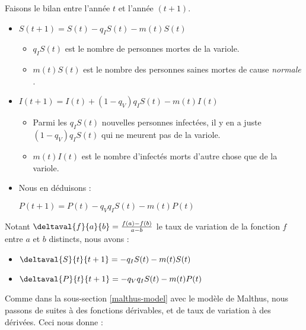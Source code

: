 

\medskip


Faisons le bilan entre l'année $t$ et l'année $(t + 1)$.

\begin{itemize}[label=\small\textbullet]
	\item $S(t + 1) = S(t) - q_I S(t) - m(t) S(t)$
	\begin{itemize}[label=$\rightarrow$]	
		\item $q_I S(t)$ est le nombre de personnes mortes de la variole.
		
		\item $m(t) S(t)$ est le nombre des personnes saines mortes de cause \emph{\og normale \fg}.
	\end{itemize}


	\item $I(t + 1) = I(t) + (1 - q_V) q_I S(t) - m(t) I(t)$
	\begin{itemize}[label=$\rightarrow$]	
		\item Parmi les $q_I S(t)$ nouvelles personnes infectées, il y en a juste $(1 - q_V) q_I S(t)$ qui ne meurent pas de la variole.
		
		\item $m(t) I(t)$ est le nombre d'infectés morts d'autre chose que de la variole.
	\end{itemize}


	\item Nous en déduisons :
	
	\noindent
	$P(t + 1) = P(t) - q_V q_I S(t) - m(t) P(t)$
\end{itemize}


Notant $\deltaval{f}{a}{b} = \frac{f(a) - f(b)}{a - b}$ le taux de variation de la fonction $f$ entre $a$ et $b$ distincts, nous avons :

\begin{itemize}[label=\small\textbullet]
	\item $\deltaval{S}{t}{t+1} = - q_I S(t) - m(t) S(t)$

	\item $\deltaval{P}{t}{t+1} = - q_V q_I S(t) - m(t) P(t)$
\end{itemize}




\medskip


Comme dans la sous-section \ref{malthus-model} avec le modèle de Malthus, nous passons de suites à des fonctions dérivables, et de taux de variation à des dérivées. Ceci nous donne : 

